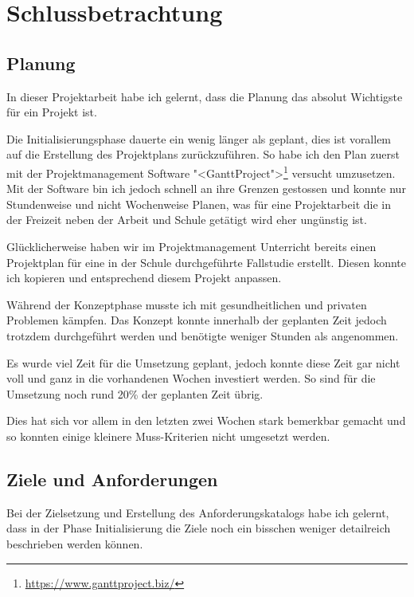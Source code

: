 \chapter{Schlussbetrachtung}

\label{ReportSchlussbetrachtung}

\section{Planung}

In dieser Projektarbeit habe ich gelernt, dass die Planung das absolut
Wichtigste für ein Projekt ist.

Die Initialisierungsphase dauerte ein wenig länger als geplant, dies ist
vorallem auf die Erstellung des Projektplans zurückzuführen. So habe ich
den Plan zuerst mit der Projektmanagement Software "<GanttProject">\footnote{\url{https://www.ganttproject.biz/}}
versucht umzusetzen. Mit der Software bin ich jedoch schnell an ihre
Grenzen gestossen und konnte nur Stundenweise und nicht Wochenweise
Planen, was für eine Projektarbeit die in der Freizeit neben der
Arbeit und Schule getätigt wird eher ungünstig ist.

Glücklicherweise haben wir im Projektmanagement Unterricht bereits einen
Projektplan für eine in der Schule durchgeführte Fallstudie erstellt.
Diesen konnte ich kopieren und entsprechend diesem Projekt anpassen.

Während der Konzeptphase musste ich mit gesundheitlichen und privaten
Problemen kämpfen. Das Konzept konnte innerhalb der geplanten Zeit jedoch
trotzdem durchgeführt werden und benötigte weniger Stunden als angenommen.

Es wurde viel Zeit für die Umsetzung geplant, jedoch konnte diese Zeit gar
nicht voll und ganz in die vorhandenen Wochen investiert werden. So sind
für die Umsetzung noch rund 20\% der geplanten Zeit übrig.

Dies hat sich vor allem in den letzten zwei Wochen stark bemerkbar gemacht und
so konnten einige kleinere Muss-Kriterien nicht umgesetzt werden.

\section{Ziele und Anforderungen}

Bei der Zielsetzung und Erstellung des Anforderungskatalogs habe ich gelernt,
dass in der Phase Initialisierung die Ziele noch ein bisschen weniger
detailreich beschrieben werden können.

